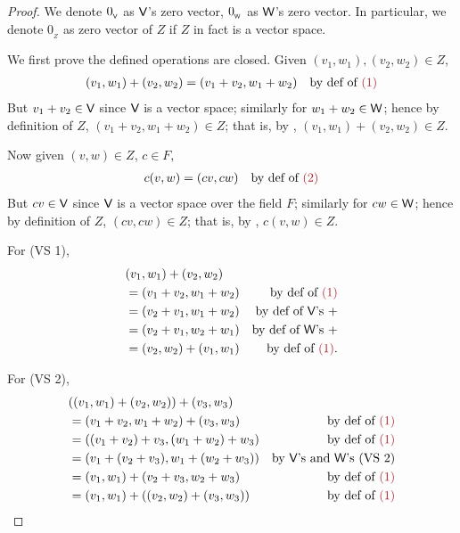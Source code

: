 \begin{proof}
We denote \(0_{_{\textsf{V}}}\) as \(\textsf{V}\)'s zero vector, \(0_{_{\textsf{W}}}\) as \(\textsf{W}\)'s zero vector.
In particular, we denote \(0_{_Z}\) as zero vector of \(Z\) if \(Z\) in fact is a vector space.

We first prove the defined operations are closed.
Given \((v_1, w_1), (v_2, w_2) \in Z\),
\begin{align*}
    (v_1, w_1) + (v_2, w_2) & = (v_1 + v_2, w_1 + w_2) & \text{by def of \MAROON{(1)}}
\end{align*}
But \(v_1 + v_2 \in \textsf{V}\) since \(\textsf{V}\) is a vector space; similarly for \(w_1 + w_2 \in \textsf{W}\);
hence by definition of \(Z\), \((v_1 + v_2, w_1 + w_2) \in Z\);
that is, by , \((v_1, w_1) + (v_2, w_2) \in Z\).

Now given \((v, w) \in Z\), \(c \in F\),
\begin{align*}
    c(v, w) & = (c v, c w) & \text{by def of \MAROON{(2)}}
\end{align*}
But \(c v \in \textsf{V}\) since \(\textsf{V}\) is a vector space over the field \(F\); similarly for \(c w \in \textsf{W}\);
hence by definition of \(Z\), \((c v, c w) \in Z\);
that is, by , \(c(v, w) \in Z\).

For (VS 1),
\begin{align*}
    & (v_1, w_1) + (v_2, w_2) \\
    & = (v_1 + v_2, w_1 + w_2) & \text{by def of \MAROON{(1)}} \\
    & = (v_2 + v_1, w_1 + w_2) & \text{by def of \(\V\)'s \(+\)} \\
    & = (v_2 + v_1, w_2 + w_1) & \text{by def of \(\W\)'s \(+\)} \\
    & = (v_2, w_2) + (v_1, w_1) & \text{by def of \MAROON{(1)}}.
\end{align*}

For (VS 2),
\begin{align*}
    & ((v_1, w_1) + (v_2, w_2)) + (v_3, w_3) \\
    & = (v_1 + v_2, w_1 + w_2) + (v_3, w_3) & \text{by def of \MAROON{(1)}} \\
    & = ((v_1 + v_2) + v_3, (w_1 + w_2) + w_3) & \text{by def of \MAROON{(1)}} \\
    & = (v_1 + (v_2 + v_3), w_1 + (w_2 + w_3)) & \text{by \(\V\)'s and \(\W\)'s (VS 2)} \\
    & = (v_1, w_1) + (v_2 + v_3, w_2 + w_3) & \text{by def of \MAROON{(1)}} \\
    & = (v_1, w_1) + ((v_2, w_2) + (v_3, w_3)) & \text{by def of \MAROON{(1)}}
\end{align*}


\end{proof}
